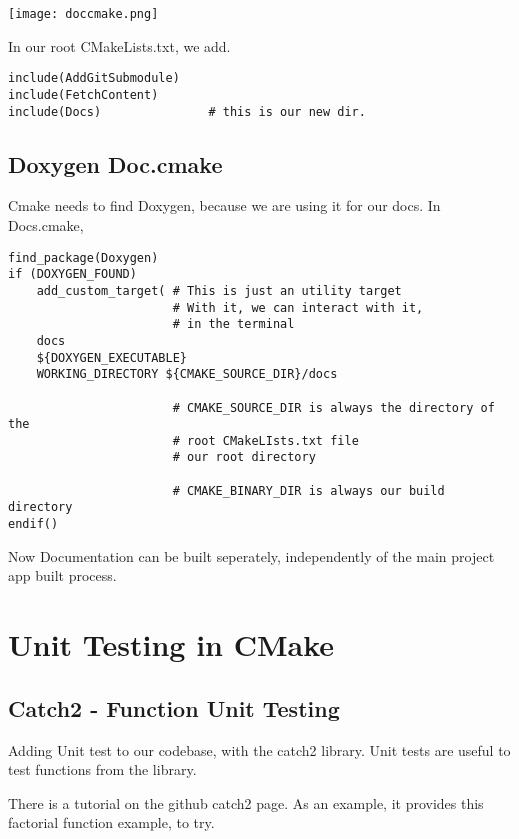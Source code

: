 \documentclass[openany]{report}
\begin{document}
\begin{center}
    \texttt{[image: doccmake.png]}
\end{center}

In our root CMakeLists.txt, we add.

\begin{verbatim}
include(AddGitSubmodule)
include(FetchContent)
include(Docs)               # this is our new dir.

\end{verbatim}


\subsection{Doxygen Doc.cmake}

Cmake needs to find Doxygen, because we are using it for our docs. In Docs.cmake,

\begin{verbatim}
find_package(Doxygen)
if (DOXYGEN_FOUND)
    add_custom_target( # This is just an utility target
                       # With it, we can interact with it, 
                       # in the terminal
    docs
    ${DOXYGEN_EXECUTABLE}
    WORKING_DIRECTORY ${CMAKE_SOURCE_DIR}/docs

                       # CMAKE_SOURCE_DIR is always the directory of the
                       # root CMakeLIsts.txt file
                       # our root directory

                       # CMAKE_BINARY_DIR is always our build directory
endif()
\end{verbatim}

Now Documentation can be built seperately, independently of the main project app built process.

\section{Unit Testing in CMake}

\subsection{Catch2 - Function Unit Testing}

Adding Unit test to our codebase, with the catch2 library. Unit tests are useful to test functions from the library.

There is a tutorial on the github catch2 page. As an example, it provides this factorial function example, to try.
\end{document}
